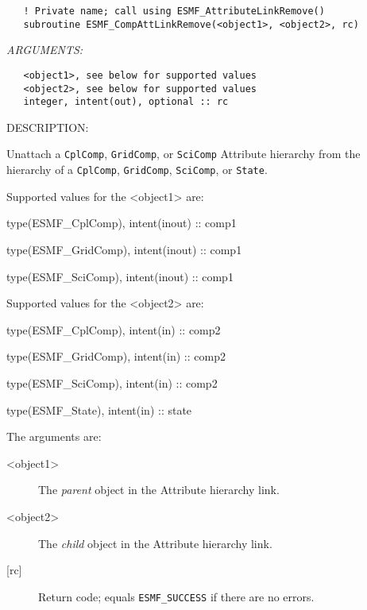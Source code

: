   
\begin{verbatim}   ! Private name; call using ESMF_AttributeLinkRemove()
   subroutine ESMF_CompAttLinkRemove(<object1>, <object2>, rc)\end{verbatim}{\em ARGUMENTS:}
\begin{verbatim}   <object1>, see below for supported values
   <object2>, see below for supported values
   integer, intent(out), optional :: rc\end{verbatim}
{\sf DESCRIPTION:\\ }


   Unattach a {\tt CplComp}, {\tt GridComp}, or {\tt SciComp} Attribute
   hierarchy from the hierarchy of a {\tt CplComp}, {\tt GridComp},
   {\tt SciComp}, or {\tt State}.
  
   Supported values for the <object1> are:
   \begin{description}
   \item type(ESMF\_CplComp), intent(inout) :: comp1
   \item type(ESMF\_GridComp), intent(inout) :: comp1
   \item type(ESMF\_SciComp), intent(inout) :: comp1
   \end{description}
  
   Supported values for the <object2> are:
   \begin{description}
   \item type(ESMF\_CplComp), intent(in) :: comp2
   \item type(ESMF\_GridComp), intent(in) :: comp2
   \item type(ESMF\_SciComp), intent(in) :: comp2
   \item type(ESMF\_State), intent(in) :: state
   \end{description}
  
   The arguments are:
   \begin{description}
   \item [<object1>]
   The \textit{parent} object in the Attribute hierarchy link.
   \item [<object2>]
   The \textit{child} object in the Attribute hierarchy link.
   \item [{[rc]}]
   Return code; equals {\tt ESMF\_SUCCESS} if there are no errors.
   \end{description}
  
   
 
\mbox{}\hrulefill\ 
 
